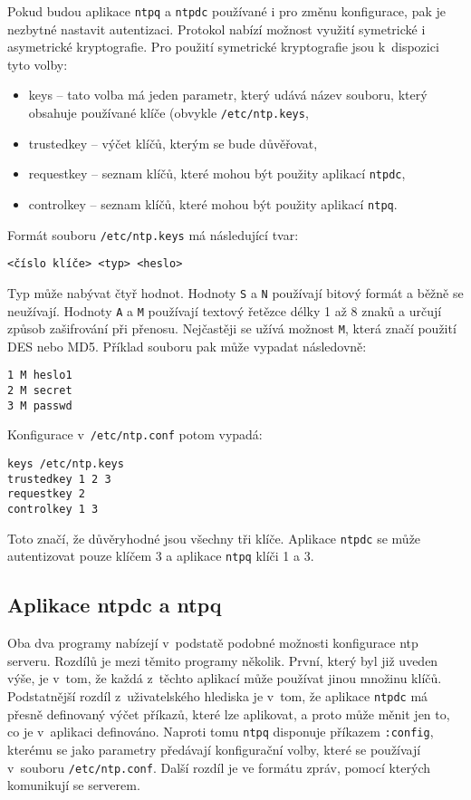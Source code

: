Pokud budou aplikace {\tt ntpq} a {\tt ntpdc} používané i pro změnu konfigurace, pak je nezbytné nastavit autentizaci. Protokol nabízí možnost využití symetrické i asymetrické kryptografie. Pro použití symetrické kryptografie jsou k~dispozici tyto volby:
\begin{itemize}
  \item keys -- tato volba má jeden parametr, který udává název souboru, který obsahuje používané klíče (obvykle {\tt /etc/ntp.keys},
  \item trustedkey -- výčet klíčů, kterým se bude důvěřovat,
  \item requestkey -- seznam klíčů, které mohou být použity aplikací {\tt ntpdc},
  \item controlkey -- seznam klíčů, které mohou být použity aplikací {\tt ntpq}.
\end{itemize}
Formát souboru {\tt /etc/ntp.keys} má následující tvar:
\begin{verbatim}
<číslo klíče> <typ> <heslo>
\end{verbatim}
Typ může nabývat čtyř hodnot. Hodnoty {\tt S} a {\tt N} používají bitový formát a běžně se neužívají. Hodnoty {\tt A} a {\tt M} používají textový řetězce délky 1 až 8 znaků a určují způsob zašifrování při přenosu. Nejčastěji se užívá možnost {\tt M}, která značí použití DES nebo MD5. Příklad souboru pak může vypadat následovně:
\begin{verbatim}
1 M heslo1
2 M secret
3 M passwd
\end{verbatim}
Konfigurace v~{\tt /etc/ntp.conf} potom vypadá:
\begin{verbatim}
keys /etc/ntp.keys
trustedkey 1 2 3
requestkey 2
controlkey 1 3
\end{verbatim}
Toto značí, že důvěryhodné jsou všechny tři klíče. Aplikace {\tt ntpdc} se může autentizovat pouze klíčem 3 a aplikace {\tt ntpq} klíči 1 a 3.


\subsection{Aplikace ntpdc a ntpq}
Oba dva programy nabízejí v~podstatě podobné možnosti konfigurace ntp serveru. Rozdílů je mezi těmito programy několik. První, který byl již uveden výše, je v~tom, že každá z~těchto aplikací může používat jinou množinu klíčů. Podstatnější rozdíl z~uživatelského hlediska je v~tom, že aplikace {\tt ntpdc} má přesně definovaný výčet příkazů, které lze aplikovat, a proto může měnit jen to, co je v~aplikaci definováno. Naproti tomu {\tt ntpq} disponuje příkazem {\tt :config}, kterému se jako parametry předávají konfigurační volby, které se používají v~souboru {\tt /etc/ntp.conf}. Další rozdíl je ve formátu zpráv, pomocí kterých komunikují se serverem.

